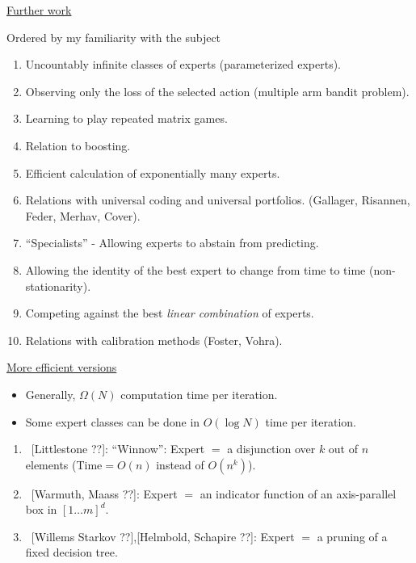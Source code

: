 \begin{flushleft}
\begin{LARGE}
\begin{center}
\underline{Further work}
\end{center}
Ordered by my familiarity with the subject
\begin{enumerate}
\item
Uncountably infinite classes of experts (parameterized experts).
\item
Observing only the loss of the selected action (multiple arm bandit
problem).
\item
Learning to play repeated matrix games.
\item
Relation to boosting.
\item
Efficient calculation of exponentially many experts.
\item
Relations with universal coding and universal portfolios.
(Gallager, Risannen, Feder, Merhav, Cover).
\item
``Specialists'' - Allowing experts to abstain from predicting.
\item
Allowing the identity of the best expert to change from time to time (non-stationarity).
\item
Competing against the best {\em linear combination} of experts.
\item
Relations with calibration methods (Foster, Vohra).
\end{enumerate}
\pagebreak

\begin{center}
\underline{More efficient versions}
\end{center}

\begin{itemize}
\item 
Generally, $\Omega(N)$ computation time per iteration.
\item
Some expert classes can be done in $O(\log N)$ time per iteration.
\end{itemize}

\begin{enumerate}
\item
~[Littlestone ??]: ``Winnow'': Expert $=$ a disjunction over $k$ out of
$n$ elements (Time$=O(n)$ instead of $O(n^k)$).
\item
~[Warmuth, Maass ??]: Expert $=$ an indicator function of an
axis-parallel box in $[1\ldots m]^d$.
\item
~[Willems Starkov ??],[Helmbold, Schapire ??]: Expert $=$ a pruning of
a fixed decision tree.
\end{enumerate}
\pagebreak


\end{LARGE}
\end{flushleft}
